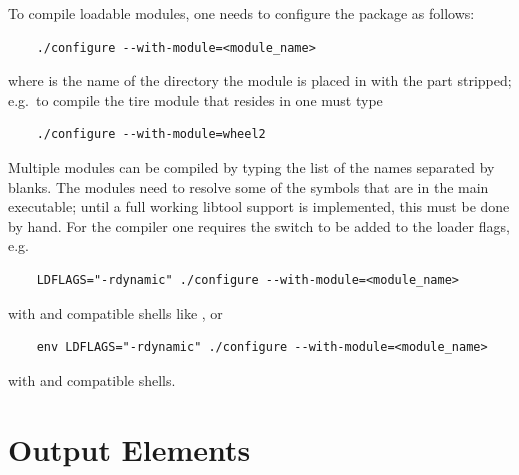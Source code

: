 \noindent
To compile loadable modules, one needs to configure
the package as follows:
\begin{verbatim}
    ./configure --with-module=<module_name>
\end{verbatim}
where  is the name of the directory the module
is placed in with the  part stripped; e.g.\ to compile
the tire module that resides in  
one must type
\begin{verbatim}
    ./configure --with-module=wheel2
\end{verbatim}
Multiple modules can be compiled by typing the list of the names
separated by blanks.
The modules need to resolve some of the symbols that are in the
main executable; until a full working libtool support is implemented,
this must be done by hand.
For the  compiler one requires the switch  
to be added to the loader flags, e.g.
\begin{verbatim}
    LDFLAGS="-rdynamic" ./configure --with-module=<module_name>
\end{verbatim}
with  and compatible shells like , or
\begin{verbatim}
    env LDFLAGS="-rdynamic" ./configure --with-module=<module_name>
\end{verbatim}
with  and compatible shells.





\section{Output Elements}

